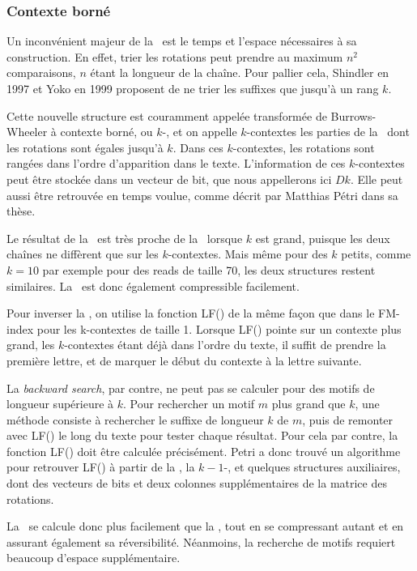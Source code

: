 \subsubsection{Contexte borné}
Un inconvénient majeur de la \bwt\ est le temps et l'espace nécessaires à sa construction. En effet, trier les rotations peut prendre au maximum $n^{2}$ comparaisons, $n$ étant la longueur de la chaîne.
Pour pallier cela, Shindler en 1997 et Yoko en 1999 proposent de ne trier les suffixes que jusqu'à un rang $k$. 

Cette nouvelle structure est couramment appelée transformée de Burrows-Wheeler à contexte borné, ou $k$-\bwt, et on appelle $k$-contextes les parties de la \kbwt\ dont les rotations sont égales jusqu'à $k$. Dans ces $k$-contextes, les rotations sont rangées dans l'ordre d'apparition dans le texte. L'information de ces $k$-contextes peut être stockée dans un vecteur de bit, que nous appellerons ici $Dk$. Elle peut aussi être retrouvée en temps voulue, comme décrit par Matthias Pétri dans sa thèse.

Le résultat de la \kbwt\ est très proche de la \bwt\ lorsque $k$ est grand, puisque les deux chaînes ne diffèrent que sur les $k$-contextes. Mais même pour des $k$ petits, comme $k = 10$ par exemple pour des reads de taille 70, les deux structures restent similaires. La \kbwt\ est donc également compressible facilement.

Pour inverser la \kbwt, on utilise la fonction LF() de la même façon que dans le FM-index pour les k-contextes de taille 1. Lorsque LF() pointe sur un contexte plus grand, les $k$-contextes étant déjà dans l'ordre du texte, il suffit de prendre la première lettre, et de marquer le début du contexte à la lettre suivante.

La \textit{backward search}, par contre, ne peut pas se calculer pour des motifs de longueur supérieure à $k$. Pour rechercher un motif $m$ plus grand que $k$, une méthode consiste à rechercher le suffixe de longueur $k$ de $m$, puis de remonter avec LF() le long du texte pour tester chaque résultat. Pour cela par contre, la fonction LF() doit être calculée précisément. Petri a donc trouvé un algorithme pour retrouver LF() à partir de la \kbwt, la $k-1$-\bwt, et quelques structures auxiliaires, dont des vecteurs de bits et deux colonnes supplémentaires de la matrice des rotations.

La \kbwt\ se calcule donc plus facilement que la \bwt, tout en se compressant autant et en assurant également sa réversibilité. Néanmoins, la recherche de motifs requiert beaucoup d'espace supplémentaire.


